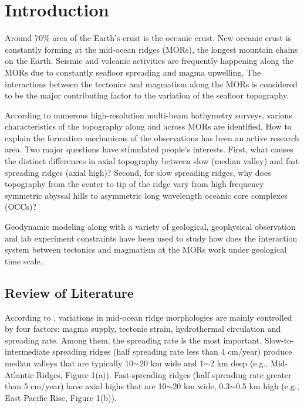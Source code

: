 \pagebreak
\section{Introduction}
\label{ch:Intro}  %

Around 70\% area of the Earth's crust is the oceanic crust. New oceanic crust is constantly forming at the mid-ocean ridges (MORs), the longest mountain chains on the Earth. Seismic and volcanic activities are frequently happening along the MORs due to constantly seafloor spreading and magma upwelling. The interactions between the tectonics and magmatism along the MORs is considered to be the major contributing factor to the variation of the seafloor topography.    

According to numerous high-resolution multi-beam bathymetry surveys, various characteristics of the topography along and across MORs are identified. How to explain the formation mechanisms of the observations has been an active research area. Two major questions have stimulated people's interests. First, what causes the distinct differences in axial topography between slow (median valley) and fast spreading ridges (axial high)? Second, for slow spreading ridges, why does topography from the center to tip of the ridge vary from high frequency symmetric abyssal hills to asymmetric long wavelength oceanic core complexes (OCCs)?

Geodynamic modeling along with a variety of geological, geophysical observation and lab experiment constraints have been used to study how does the interaction system between tectonics and magmatism at the MORs work under geological time scale.

\subsection{Review of Literature}
According to \citep{Fowler2004}, variations in  mid-ocean ridge morphologies are mainly controlled by four factors: magma supply, tectonic strain, hydrothermal circulation and spreading rate. Among them, the spreading rate is the most important. Slow-to-intermediate spreading ridges (half spreading rate less than 4 cm/year) produce median valleys that are typically 10$\sim$20 km wide and 1$\sim$2 km deep (e.g., Mid-Atlantic Ridges, Figure 1(a)). Fast-spreading ridges (half spreading rate greater than 5 cm/year) have axial highs that are 10$\sim$20 km wide, 0.3$\sim$0.5 km high (e.g., East Pacific Rise, Figure 1(b)).

